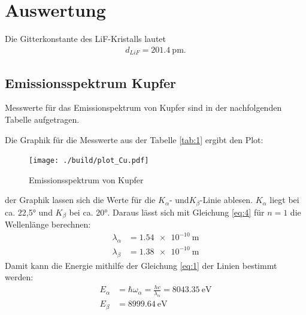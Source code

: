 
\section{Auswertung}

Die Gitterkonstante des LiF-Kristalls lautet \cite{V603}
\begin{align}
    d_{LiF}=\SI{201.4}{\pico\meter} \label{eq:5}.
\end{align}

\subsection{Emissionsspektrum Kupfer}

\justifying Messwerte für das Emissionspektrum von Kupfer sind in der nachfolgenden Tabelle 
aufgetragen.







Die Graphik für die Messwerte aus der Tabelle \ref{tab:1} ergibt den Plot:
\begin{figure}[H]
    \centering
    \texttt{[image: ./build/plot\_Cu.pdf]}
    \caption{Emissionsspektrum von Kupfer}
    \label{fig:3}
\end{figure}

\justifying der Graphik lassen sich die Werte für die $K_{\alpha}$- und$K_{\beta}$-Linie
ablesen. $K_{\alpha}$ liegt bei ca. 22,5° und $K_{\beta}$ bei ca. 20°.
Daraus lässt sich mit Gleichung \eqref{eq:4} für $n=1$ die Wellenlänge berechnen:
\begin{align}
    \lambda _{\alpha}&= \SI{1.54e-10}{\meter} \label{eq:6}\\
    \lambda_{\beta}&= \SI{1.38e-10}{\meter} \label{eq:7}
\end{align}
Damit kann die Energie mithilfe der Gleichung \eqref{eq:1} der Linien bestimmt werden:
\begin{subequations}
\begin{align}
    E_{\alpha}&= \hbar \omega _{\alpha} = \frac{h c}{\lambda _{\alpha}}=\SI{8043.35}{\electronvolt}  \label{eq:8a} \\
    E_{\beta}&= \SI{8999.64}{\electronvolt} \label{eq:8b}
\end{align}
\end{subequations}

